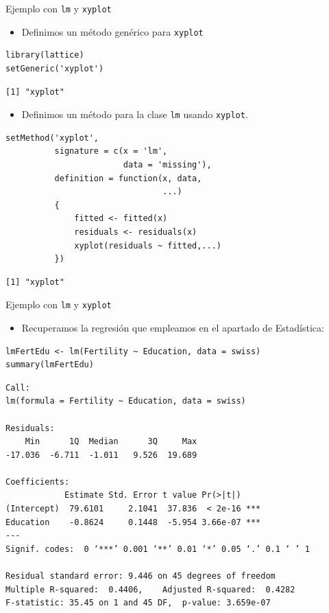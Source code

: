 \documentclass[xcolor={usenames,svgnames,dvipsnames}]{beamer}
\begin{document}
\begin{frame}[fragile,label={sec:orgheadline38}]{Ejemplo con \texttt{lm} y \texttt{xyplot}}
 \begin{itemize}
\item Definimos un método genérico para \texttt{xyplot}
\end{itemize}
\lstset{language=R,label= ,caption= ,captionpos=b,numbers=none}
\begin{lstlisting}
library(lattice)
setGeneric('xyplot')
\end{lstlisting}

\begin{verbatim}
[1] "xyplot"
\end{verbatim}

\begin{itemize}
\item Definimos un método para la clase \texttt{lm} usando \texttt{xyplot}.
\end{itemize}
\lstset{language=R,label= ,caption= ,captionpos=b,numbers=none}
\begin{lstlisting}
setMethod('xyplot',
          signature = c(x = 'lm',
                        data = 'missing'),
          definition = function(x, data,
                                ...)
          {
              fitted <- fitted(x)
              residuals <- residuals(x)
              xyplot(residuals ~ fitted,...)
          })
\end{lstlisting}

\begin{verbatim}
[1] "xyplot"
\end{verbatim}
\end{frame}

\begin{frame}[fragile,label={sec:orgheadline39}]{Ejemplo con \texttt{lm} y \texttt{xyplot}}
 \begin{itemize}
\item Recuperamos la regresión que empleamos en el apartado de Estadística:
\end{itemize}
\lstset{language=R,label= ,caption= ,captionpos=b,numbers=none}
\begin{lstlisting}
lmFertEdu <- lm(Fertility ~ Education, data = swiss)
summary(lmFertEdu)
\end{lstlisting}

\begin{verbatim}
Call:
lm(formula = Fertility ~ Education, data = swiss)

Residuals:
    Min      1Q  Median      3Q     Max 
-17.036  -6.711  -1.011   9.526  19.689 

Coefficients:
            Estimate Std. Error t value Pr(>|t|)    
(Intercept)  79.6101     2.1041  37.836  < 2e-16 ***
Education    -0.8624     0.1448  -5.954 3.66e-07 ***
---
Signif. codes:  0 ‘***’ 0.001 ‘**’ 0.01 ‘*’ 0.05 ‘.’ 0.1 ‘ ’ 1

Residual standard error: 9.446 on 45 degrees of freedom
Multiple R-squared:  0.4406,	Adjusted R-squared:  0.4282 
F-statistic: 35.45 on 1 and 45 DF,  p-value: 3.659e-07
\end{verbatim}
\end{frame}
\end{document}
